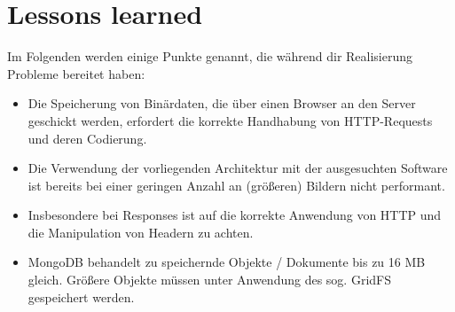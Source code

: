 \clearpage
\section{Lessons learned}
Im Folgenden werden einige Punkte genannt, die während dir Realisierung Probleme bereitet haben:
\begin{itemize}
	\item Die Speicherung von Binärdaten, die über einen Browser an den Server geschickt werden,
	erfordert die korrekte Handhabung von HTTP-Requests und deren Codierung.
	\item Die Verwendung der vorliegenden Architektur mit der ausgesuchten Software 
	ist bereits bei einer geringen Anzahl an (größeren) Bildern nicht performant.
	\item Insbesondere bei Responses ist auf die korrekte Anwendung von HTTP und die Manipulation von Headern zu achten.
	\item MongoDB behandelt zu speichernde Objekte / Dokumente bis zu 16 MB gleich. Größere Objekte
	müssen unter Anwendung des sog. GridFS gespeichert werden.
\end{itemize}